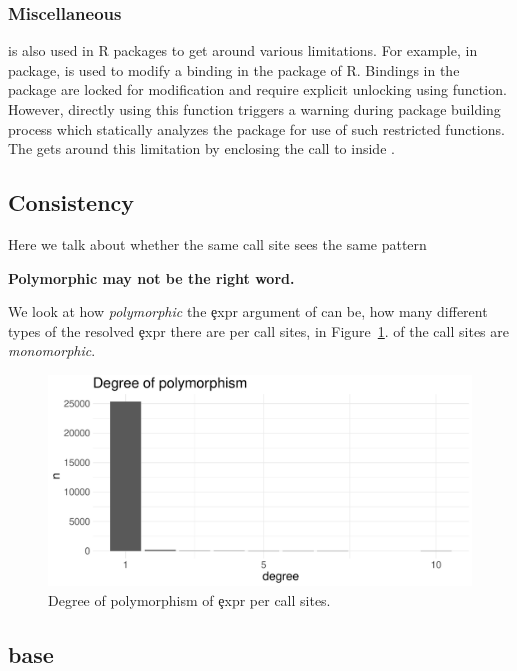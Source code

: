 \documentclass[conference]{IEEEtran}
\begin{document}
  \subsubsection{Miscellaneous} \eval is also used in R packages to get around
  various limitations. For example, in \datatable package, \eval is used to modify
  a binding in the \base package of R. Bindings in the \base package are locked
  for modification and require explicit unlocking using \unlockBinding function.
  However, directly using this function triggers a warning during package building
  process which statically analyzes the package for use of such restricted
  functions. The \datatable gets around this limitation by enclosing the call to
  \unlockBinding inside \eval.

\subsection{Consistency}

Here we talk about whether the same call site sees the same pattern

{\bf Polymorphic may not be the right word.}

We look at how \emph{polymorphic} the \c{expr} argument of \eval can be, \ie
how many different types of the resolved \c{expr} there are per call sites,
in Figure~\ref{fig:polymorphism}. \PercentMonomorphic of the call sites are
\emph{monomorphic}.

\begin{figure}[!h]
	\centering
    \includegraphics[width=\columnwidth]{polymorphism}
    \caption{Degree of polymorphism of \c{expr} per call sites.} \label{fig:polymorphism}
\end{figure}

\subsection{base}
\end{document}
